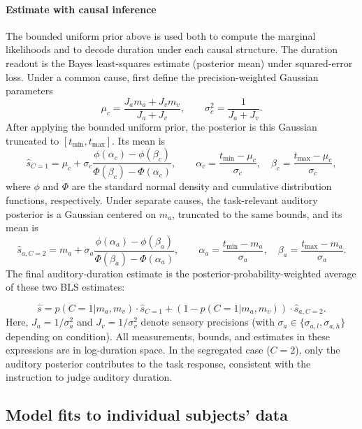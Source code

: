 \documentclass{jov}
\begin{document}
\paragraph{Estimate with causal inference}
The bounded uniform prior above is used both to compute the marginal likelihoods and to decode duration under each causal structure. The duration readout is the Bayes least-squares estimate (posterior mean) under squared-error loss. Under a common cause, first define the precision-weighted Gaussian parameters
\begin{equation}
\mu_c = \frac{J_a m_a + J_v m_v}{J_a + J_v},
\qquad
\sigma_c^2 = \frac{1}{J_a + J_v}.
\end{equation}
After applying the bounded uniform prior, the posterior is this Gaussian truncated to $[t_{\min},t_{\max}]$. Its mean is
\begin{equation}
\hat{s}_{C=1}
= \mu_c + \sigma_c
\frac{\phi(\alpha_c)-\phi(\beta_c)}
{\Phi(\beta_c)-\Phi(\alpha_c)},
\qquad
\alpha_c=\frac{t_{\min}-\mu_c}{\sigma_c},
\quad
\beta_c=\frac{t_{\max}-\mu_c}{\sigma_c},
\end{equation}
where $\phi$ and $\Phi$ are the standard normal density and cumulative distribution functions, respectively. Under separate causes, the task-relevant auditory posterior is a Gaussian centered on $m_a$, truncated to the same bounds, and its mean is
\begin{equation}
\hat{s}_{a,C=2}
= m_a + \sigma_a
\frac{\phi(\alpha_a)-\phi(\beta_a)}
{\Phi(\beta_a)-\Phi(\alpha_a)},
\qquad
\alpha_a=\frac{t_{\min}-m_a}{\sigma_a},
\quad
\beta_a=\frac{t_{\max}-m_a}{\sigma_a}.
\end{equation}
The final auditory-duration estimate is the posterior-probability-weighted average of these two BLS estimates:

\begin{equation}
\hat{s} = p(C=1 | m_a, m_v) \cdot \hat{s}_{C=1}
+ (1 - p(C=1 | m_a, m_v)) \cdot \hat{s}_{a,C=2}.
\end{equation}
Here, $J_a = 1/\sigma_a^2$ and $J_v = 1/\sigma_v^2$ denote sensory precisions (with $\sigma_a \in \{\sigma_{a,l}, \sigma_{a,h}\}$ depending on condition). All measurements, bounds, and estimates in these expressions are in log-duration space. In the segregated case ($C=2$), only the auditory posterior contributes to the task response, consistent with the instruction to judge auditory duration.


\subsection{Model fits to individual subjects' data}
\end{document}
